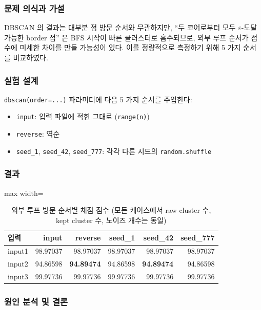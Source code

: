 \documentclass[12pt, a4paper]{article}
\begin{document}
\subsubsection*{문제 의식과 가설}

DBSCAN 의 결과는 대부분 점 방문 순서와 무관하지만, ``두 코어로부터 모두 $\varepsilon$-도달 가능한 border 점'' 은 BFS 시작이 빠른 클러스터로 흡수되므로, 외부 루프 순서가 점수에 미세한 차이를 만들 가능성이 있다. 이를 정량적으로 측정하기 위해 5 가지 순서를 비교하였다.

\subsubsection*{실험 설계}

\texttt{dbscan(order=...)} 파라미터에 다음 5 가지 순서를 주입한다:
\begin{itemize}
    \item \texttt{input}: 입력 파일에 적힌 그대로 (\texttt{range(n)})
    \item \texttt{reverse}: 역순
    \item \texttt{seed\_1}, \texttt{seed\_42}, \texttt{seed\_777}: 각각 다른 시드의 \texttt{random.shuffle}
\end{itemize}

\subsubsection*{결과}

\begin{table}[h]
\centering
\begin{adjustbox}{max width=\textwidth}
\begin{tabular}{lrrrrr}
\toprule
\textbf{입력} & \textbf{input} & \textbf{reverse} & \textbf{seed\_1} & \textbf{seed\_42} & \textbf{seed\_777} \\
\midrule
input1 & 98.97037 & 98.97037 & 98.97037 & 98.97037 & 98.97037 \\
input2 & 94.86598 & \textbf{94.89474} & 94.86598 & \textbf{94.89474} & 94.86598 \\
input3 & 99.97736 & 99.97736 & 99.97736 & 99.97736 & 99.97736 \\
\bottomrule
\end{tabular}
\end{adjustbox}
\caption{외부 루프 방문 순서별 채점 점수 (모든 케이스에서 raw cluster 수, kept cluster 수, 노이즈 개수는 동일)}
\end{table}

\subsubsection*{원인 분석 및 결론}
\end{document}

